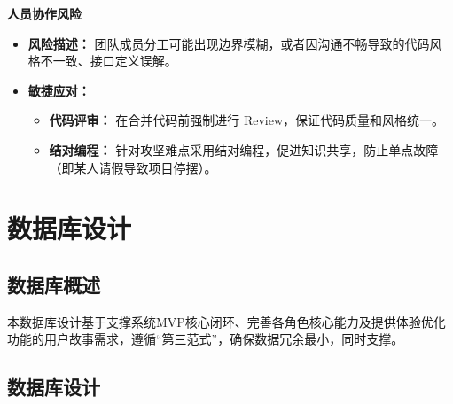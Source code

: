 \begin{levellist}
    \item \textbf{人员协作风险}
    \begin{itemize}
        \item \textbf{风险描述：} 团队成员分工可能出现边界模糊，或者因沟通不畅导致的代码风格不一致、接口定义误解。
        \item \textbf{敏捷应对：}
              \begin{itemize}
                  \item \textbf{代码评审：} 在合并代码前强制进行 Review，保证代码质量和风格统一。
                  \item \textbf{结对编程：} 针对攻坚难点采用结对编程，促进知识共享，防止单点故障（即某人请假导致项目停摆）。
              \end{itemize}
    \end{itemize}

\end{levellist}


\newpage

\section{数据库设计}

\subsection{数据库概述}
本数据库设计基于支撑系统MVP核心闭环、完善各角色核心能力及提供体验优化功能的用户故事需求，遵循“第三范式”，确保数据冗余最小，同时支撑。

\subsection{数据库设计}

